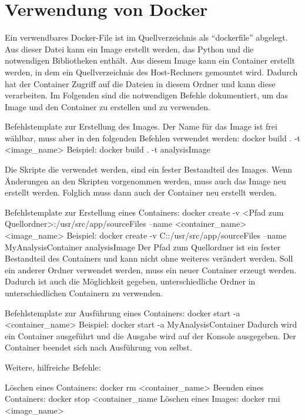 \section{Verwendung von Docker}
\label{docker:examples}

Ein verwendbares Docker-File ist im Quellverzeichnis als \enquote{dockerfile} abgelegt.
Aus dieser Datei kann ein Image erstellt werden, das Python und die notwendigen Bibliotheken enthält.
Aus diesem Image kann ein Container erstellt werden, in dem ein Quellverzeichnis des Host-Rechners gemountet wird.
Dadurch hat der Container Zugriff auf die Dateien in diesem Ordner und kann diese verarbeiten.
Im Folgenden sind die notwendigen Befehle dokumentiert, um das Image und den Container zu erstellen und zu verwenden.
{}{}
	
\begin{DockerCommands}
Befehlstemplate zur Erstellung des Images. Der Name für das Image ist frei wählbar,
muss aber in den folgenden Befehlen verwendet werden:
	docker build . -t <image_name>
Beispiel:
	docker build . -t analysisImage
	
Die Skripte die verwendet werden, sind ein fester Bestandteil des Images.
Wenn Änderungen an den Skripten vorgenommen werden, muss auch das Image neu erstellt
werden.
Folglich muss dann auch der Container neu erstellt werden.
		
Befehlstemplate zur Erstellung eines Containers:
	docker create  -v <Pfad zum Quellordner>:/usr/src/app/sourceFiles  --name <container_name>  <image_name>
Beispiel:	
	docker create  -v C:\Temp\sourcefiles:/usr/src/app/sourceFiles  --name MyAnalysisContainer  analysisImage
Der Pfad zum Quellordner ist ein fester Bestandteil des Containers und kann nicht
ohne weiteres verändert werden.
Soll ein anderer Ordner verwendet werden, muss ein neuer Container erzeugt werden.
Dadurch ist auch die Möglichkeit gegeben, unterschiedliche Ordner in 
unterschiedlichen Containern zu verwenden.

Befehlstemplate zur Ausführung eines Containers:
	docker start -a <container_name>
Beispiel:
	docker start -a MyAnalysisContainer
Dadurch wird ein Container ausgeführt und die Ausgabe wird auf der Konsole 
ausgegeben. Der Container beendet sich nach Ausführung von selbst.



Weitere, hilfreiche Befehle:

Löschen eines Containers:
	docker rm <container_name>
Beenden eines Containers:
	docker stop <container_name
Löschen eines Images:
	docker rmi <image_name>
\end{DockerCommands}
